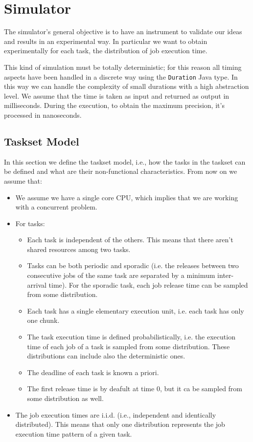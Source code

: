 \chapter{Simulator}
The simulator's general objective is to have an instrument to validate our ideas and results in an experimental way. In particular we want to obtain experimentally for each task, the distribution of job execution time.

This kind of simulation must be totally deterministic; for this reason all timing aspects have been handled in a discrete way using the \texttt{Duration} Java type. In this way we can handle the complexity of small durations with a high abstraction level. We assume that the time is taken as input and returned as output in milliseconds. During the execution, to obtain the maximum precision, it's processed in nanoseconds.


\section{Taskset Model}
\label{sec:simulator_task_model}
In this section we define the taskset model, i.e., how the tasks in the taskset can be defined and what are their non-functional characteristics.
From now on we assume that:
\begin{itemize}
    \item We assume we have a single core CPU, which implies that we are working with a concurrent problem.
    \item For tasks:
    \begin{itemize}
        \item Each task is independent of the others. This means that there aren't shared resources among two tasks.
        \item Tasks can be both periodic and sporadic (i.e. the releases between two consecutive jobs of the same task are separated by a minimum inter-arrival time). For the sporadic task, each job release time can be sampled from some distribution.
        \item Each task has a single elementary execution unit, i.e. each task has only one chunk.
        \item The task execution time is defined probabilistically, i.e. the execution time of each job of a task is sampled from some distribution. These distributions can include also the deterministic ones.
        \item The deadline of each task is known a priori.
        \item The first release time is by deafult at time 0, but it ca be sampled from some distribution as well.
    \end{itemize}
    \item The job execution times are i.i.d. (i.e., independent and identically distributed). This means that only one distribution represents the job execution time pattern of a given task.
\end{itemize}

